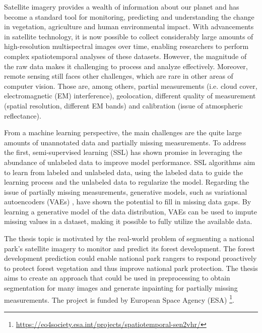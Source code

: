 

Satellite imagery provides a wealth of information about our planet and has become a standard tool for monitoring, predicting
and understanding the change in vegetation, agriculture and human environmental impact. With advancements in satellite technology, it
is now possible to collect considerably large amounts of high-resolution multispectral images over time, enabling researchers to perform
complex spatiotemporal analyses of these datasets. However, the magnitude of the raw data makes it challenging to process and analyze effectively. 
Moreover, remote sensing still faces other challenges, which are rare in other areas of computer vision. Those are, among 
others, partial measurements (i.e. cloud cover, electromagnetic (EM) interference), geolocation, different quality of measurement (spatial 
resolution, different EM bands) and calibration (issue of atmospheric reflectance).

From a machine learning perspective, the main challenges are the quite large amounts of unannotated data and partially missing measurements.
To address the first, semi-supervised learning \cite{ssl-book-2006} (SSL) has shown promise in leveraging the abundance of unlabeled
data to improve model performance. SSL algorithms aim to learn from labeled and unlabeled data, using the labeled data to guide the 
learning process and the unlabeled data to regularize the model. Regarding the issue of partially missing measurements, generative
models, such as variational autoencoders (VAEs) \cite{intro-vae-2019}, have shown the potential to fill in missing data gaps. 
By learning a generative model of the data distribution, VAEs can be used to impute missing values in a dataset, making it possible to 
fully utilize the available data.

The thesis topic is motivated by the real-world problem of segmenting a national park's satellite imagery to monitor and predict 
its forest development. The forest development prediction could enable national park rangers to respond proactively to protect forest vegetation and thus
improve national park protection. The thesis aims to create an approach that could be used in preprocessing to obtain segmentation for many images and 
generate inpainting for partially missing measurements. The project is funded by European Space Agency (ESA)
\footnote[1]{\url{https://eo4society.esa.int/projects/spatiotemporal-sen2vhr/}}.

